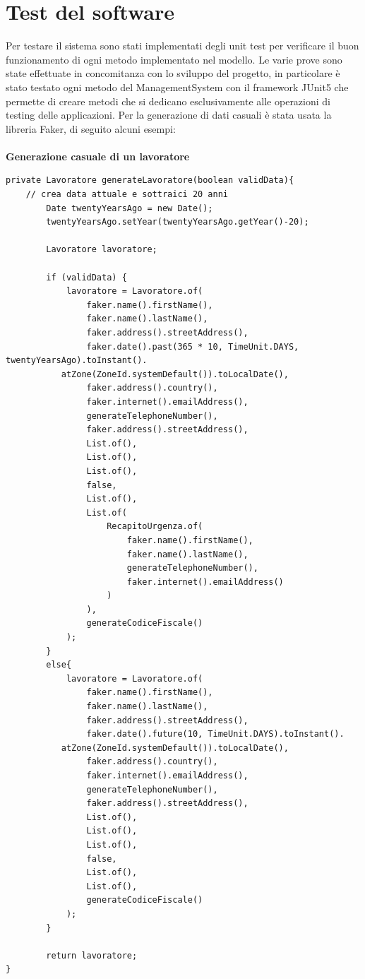 \documentclass[ 4paper,11pt,openany]{book}
\begin{document}
\section{Test del software}
Per testare il sistema sono stati implementati degli unit test per verificare il buon funzionamento di ogni metodo implementato nel modello. Le varie prove sono state effettuate in concomitanza con lo sviluppo del progetto, in particolare è stato testato ogni metodo del ManagementSystem con il framework JUnit5 che permette di creare metodi che si dedicano esclusivamente alle operazioni di testing delle applicazioni.  Per la generazione di dati casuali è stata usata la libreria Faker, di seguito alcuni esempi:\\\\
\textbf{Generazione casuale di un lavoratore}
\begin{lstlisting}[basicstyle=\small,xleftmargin=-0.5cm]
private Lavoratore generateLavoratore(boolean validData){
	// crea data attuale e sottraici 20 anni
        Date twentyYearsAgo = new Date();
        twentyYearsAgo.setYear(twentyYearsAgo.getYear()-20);

        Lavoratore lavoratore;

        if (validData) {
            lavoratore = Lavoratore.of(
                faker.name().firstName(),
                faker.name().lastName(),
                faker.address().streetAddress(),
                faker.date().past(365 * 10, TimeUnit.DAYS, twentyYearsAgo).toInstant().
		   atZone(ZoneId.systemDefault()).toLocalDate(),
                faker.address().country(),
                faker.internet().emailAddress(),
                generateTelephoneNumber(),
                faker.address().streetAddress(),
                List.of(),
                List.of(),
                List.of(),
                false,
                List.of(),
                List.of(
                    RecapitoUrgenza.of(
                        faker.name().firstName(),
                        faker.name().lastName(),
                        generateTelephoneNumber(),
                        faker.internet().emailAddress()
                    )
                ),
                generateCodiceFiscale()
            );
        }
        else{
            lavoratore = Lavoratore.of(
                faker.name().firstName(),
                faker.name().lastName(),
                faker.address().streetAddress(),
                faker.date().future(10, TimeUnit.DAYS).toInstant().
		   atZone(ZoneId.systemDefault()).toLocalDate(),
                faker.address().country(),
                faker.internet().emailAddress(),
                generateTelephoneNumber(),
                faker.address().streetAddress(),
                List.of(),
                List.of(),
                List.of(),
                false,
                List.of(),
                List.of(),
                generateCodiceFiscale()
            );
        }

        return lavoratore;
}
\end{lstlisting}
\end{document}
